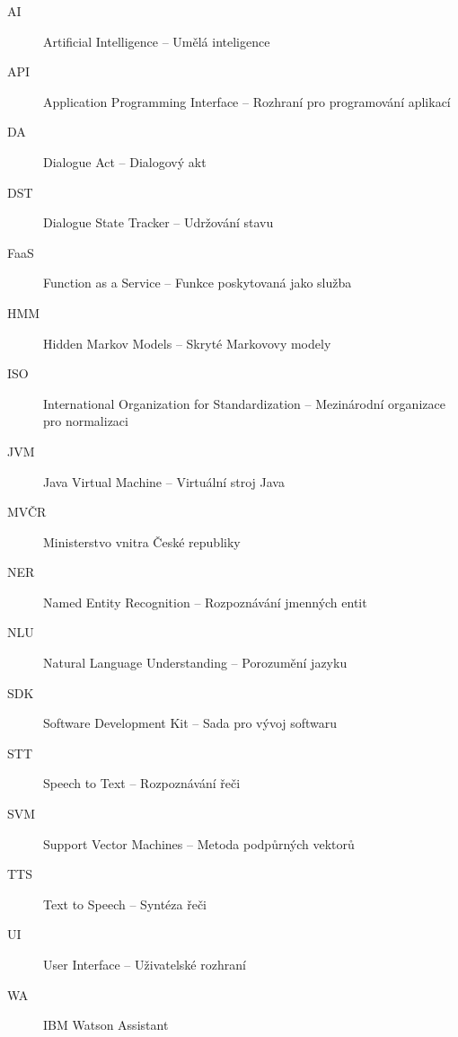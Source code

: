 \documentclass[12pt,a4paper]{report}
\begin{document}



\tableofcontents













\begin{description}
    \item[AI] Artificial Intelligence -- Umělá inteligence
    \item[API] Application Programming Interface -- Rozhraní pro programování aplikací
    \item[DA] Dialogue Act -- Dialogový akt
    \item[DST] Dialogue State Tracker -- Udržování stavu
    \item[FaaS] Function as a Service -- Funkce poskytovaná jako služba
    \item[HMM] Hidden Markov Models -- Skryté Markovovy modely
    \item[ISO] International Organization for Standardization -- Mezinárodní organizace pro normalizaci
    \item[JVM] Java Virtual Machine -- Virtuální stroj Java
    \item[MVČR] Ministerstvo vnitra České republiky
    \item[NER] Named Entity Recognition -- Rozpoznávání jmenných entit
    \item[NLU] Natural Language Understanding -- Porozumění jazyku
    \item[SDK] Software Development Kit -- Sada pro vývoj softwaru
    \item[STT] Speech to Text -- Rozpoznávání řeči
    \item[SVM] Support Vector Machines -- Metoda podpůrných vektorů
    \item[TTS] Text to Speech -- Syntéza řeči
    \item[UI] User Interface -- Uživatelské rozhraní
    \item[WA] IBM Watson Assistant
\end{description}
\end{document}
